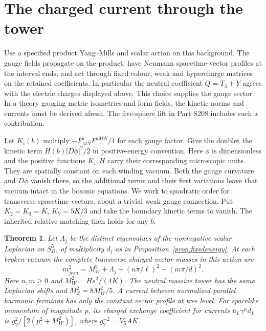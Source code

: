 \documentclass[aps,prd,reprint,onecolumn,nofootinbib,amsmath,amssymb]{revtex4-2}
\newtheorem{theorem}{Theorem}
\begin{document}
\section{The charged current through the tower}
Use a specified product Yang--Mills and scalar action on this background. The gauge fields propagate on the product, have Neumann spacetime-vector profiles at the interval ends, and act through fixed colour, weak and hypercharge matrices on the retained coefficients. In particular the neutral coefficient $Q=T_3+Y$ agrees with the electric charges displayed above. This choice supplies the gauge sector. In a theory gauging metric isometries and form fields, the kinetic norms and currents must be derived afresh. The five-sphere lift in Part S208 includes such a contribution.

Let $K_i(b)$ multiply $-F^a_{MN}F^{aMN}/4$ for each gauge factor. Give the doublet the kinetic term $H(b)|D\phi|^2/2$ in positive-energy convention. Here $\phi$ is dimensionless and the positive functions $K_i,H$ carry their corresponding microscopic units. They are spatially constant on each winding vacuum. Both the gauge curvature and $D\phi$ vanish there, so the additional terms and their first variations leave that vacuum intact in the bosonic equations. We work to quadratic order for transverse spacetime vectors, about a trivial weak gauge connection. Put $K_2=K_3=K$, $K_Y=5K/3$ and take the boundary kinetic terms to vanish. The inherited relative matching then holds for any $b$.

\begin{theorem}
Let $\Lambda_j$ be the distinct eigenvalues of the nonnegative scalar Laplacian on $S^5_R$, of multiplicity $d_j$ as in Proposition~\ref{prop:fixedenergy}. At each broken vacuum the complete transverse charged-vector masses in this action are
\begin{equation}
 m^2_{jnm}=M_W^2+\Lambda_j+(n\pi/\ell)^2+(m\pi/d)^2 .
 \label{eq:tower}
\end{equation}
Here $n,m\ge0$ and $M_W^2=Hs^2/(4K)$. The neutral massive tower has the same Laplacian shifts and $M_Z^2=8M_W^2/5$. A current between normalized parallel harmonic fermions has only the constant vector profile at tree level. For spacelike momentum of magnitude $p$, its charged exchange coefficient for currents $\bar u_L\gamma^\mu d_L$ is $g_2^2/[2(p^2+M_W^2)]$, where $g_2^{-2}=V_5 A K$.
\end{theorem}
\end{document}
